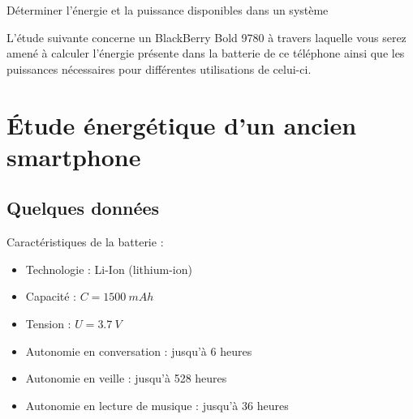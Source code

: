 \documentclass[10pt,fleqn]{article} %
\begin{document}

\begin{obj}
Déterminer l’énergie et la puissance disponibles dans un système

L’étude suivante concerne un BlackBerry Bold 9780 à travers laquelle vous serez amené à
 calculer l’énergie présente dans la batterie de ce téléphone ainsi que les puissances 
 nécessaires pour différentes utilisations de celui-ci.
 
\end{obj}
\section{Étude énergétique d'un ancien smartphone}
\subsection{Quelques données}
Caractéristiques de la batterie :
\begin{itemize}
 \item Technologie : Li-Ion (lithium-ion)
\item Capacité : $ C = \SI{1500}{mAh} $
\item Tension : $U=\SI{3.7}{V}$
\item Autonomie en conversation : jusqu'à 6 heures
\item Autonomie en veille : jusqu’à 528 heures
\item Autonomie en lecture de musique : jusqu'à 36 heures
\end{itemize}
\end{document}
